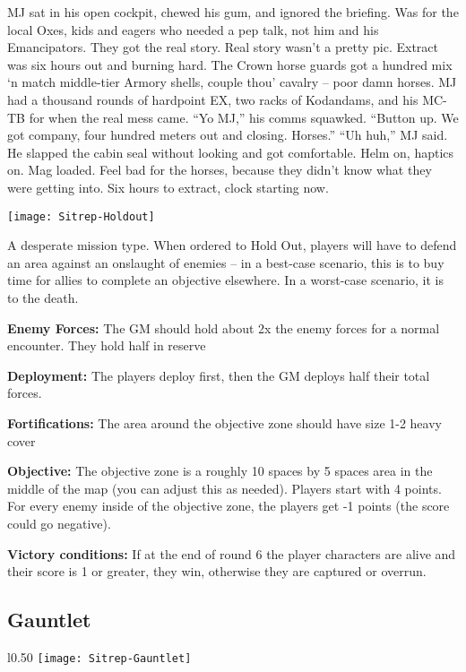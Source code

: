  MJ sat in his open cockpit, chewed his gum, and ignored the briefing. Was for the local Oxes, kids and eagers who needed a pep talk, not him and his Emancipators. They got the real story. Real story wasn’t a pretty pic. Extract was six hours out and burning hard. The Crown horse guards got a hundred mix ‘n match middle-tier Armory shells, couple thou’ cavalry -- poor damn horses. MJ had a thousand rounds of hardpoint EX, two racks of Kodandams, and his MC-TB for when the real mess came. “Yo MJ,” his comms squawked. “Button up. We got company, four hundred meters out and closing. Horses.” “Uh huh,” MJ said. He slapped the cabin seal without looking and got comfortable. Helm on, haptics on. Mag loaded. Feel bad for the horses, because they didn’t know what they were getting into. Six hours to extract, clock starting now.

 \begin{center}
   \texttt{[image: Sitrep-Holdout]}
 \end{center}
 
 A desperate mission type. When ordered to Hold Out, players will have to defend an area against an onslaught of enemies -- in a best-case scenario, this is to buy time for allies to complete an objective elsewhere. In a worst-case scenario, it is to the death.

 \textbf{Enemy Forces:} The GM should hold about 2x the enemy forces for a normal encounter. They hold half in reserve

 \textbf{Deployment:} The players deploy first, then the GM deploys half their total forces.

 \textbf{Fortifications:} The area around the objective zone should have size 1-2 heavy cover

 \textbf{Objective:} The objective zone is a roughly 10 spaces by 5 spaces area in the middle of the map (you can adjust this as needed). Players start with 4 points. For every enemy inside of the objective zone, the players get -1 points (the score could go negative).

 \textbf{Victory conditions:}  If at the end of round 6 the player characters are alive and their score is 1 or greater, they win, otherwise they are captured or overrun.



 \subsection{Gauntlet}

 \begin{wrapfigure}{l}{0.50\textwidth}
   \centering
   \texttt{[image: Sitrep-Gauntlet]}
 \end{wrapfigure}


